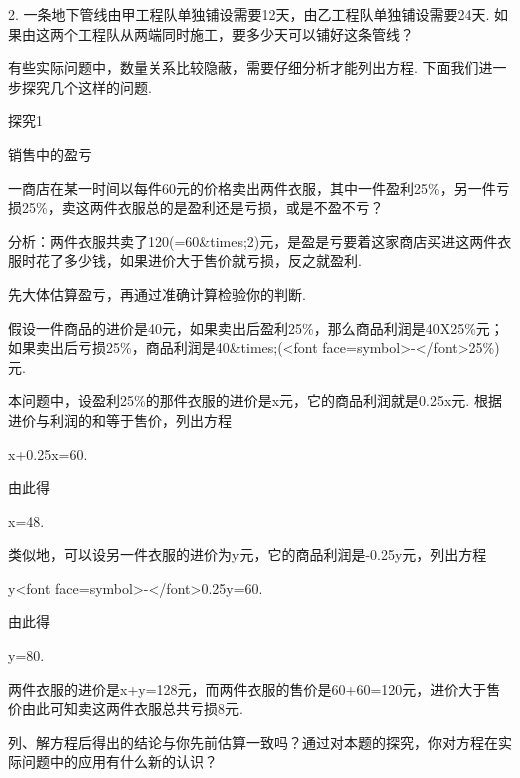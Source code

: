 2. 一条地下管线由甲工程队单独铺设需要12天，由乙工程队单独铺设需要24天. 如果由这两个工程队从两端同时施工，要多少天可以铺好这条管线？\newline
\endexercise
\beginexample

有些实际问题中，数量关系比较隐蔽，需要仔细分析才能列出方程. 下面我们进一步探究几个这样的问题. \newline

探究1\newline

销售中的盈亏\newline

一商店在某一时间以每件60元的价格卖出两件衣服，其中一件盈利25\%，另一件亏损25\%，卖这两件衣服总的是盈利还是亏损，或是不盈不亏？\newline

分析：两件衣服共卖了120(=60&times;2)元，是盈是亏要着这家商店买进这两件衣服时花了多少钱，如果进价大于售价就亏损，反之就盈利. \newline

先大体估算盈亏，再通过准确计算检验你的判断. \newline

假设一件商品的进价是40元，如果卖出后盈利25\%，那么商品利润是40X25\%元；如果卖出后亏损25\%，商品利润是40&times;(<font face=symbol>-</font>25\%)元. \newline

本问题中，设盈利25\%的那件衣服的进价是x元，它的商品利润就是0.25x元. 根据进价与利润的和等于售价，列出方程\newline

x+0.25x=60.\newline

由此得\newline

x=48.\newline

类似地，可以设另一件衣服的进价为y元，它的商品利润是-0.25y元，列出方程\newline

y<font face=symbol>-</font>0.25y=60.\newline

由此得\newline

y=80.\newline

两件衣服的进价是x+y=128元，而两件衣服的售价是60+60=120元，进价大于售价由此可知卖这两件衣服总共亏损8元. \newline

列、解方程后得出的结论与你先前估算一致吗？通过对本题的探究，你对方程在实际问题中的应用有什么新的认识？\newline

